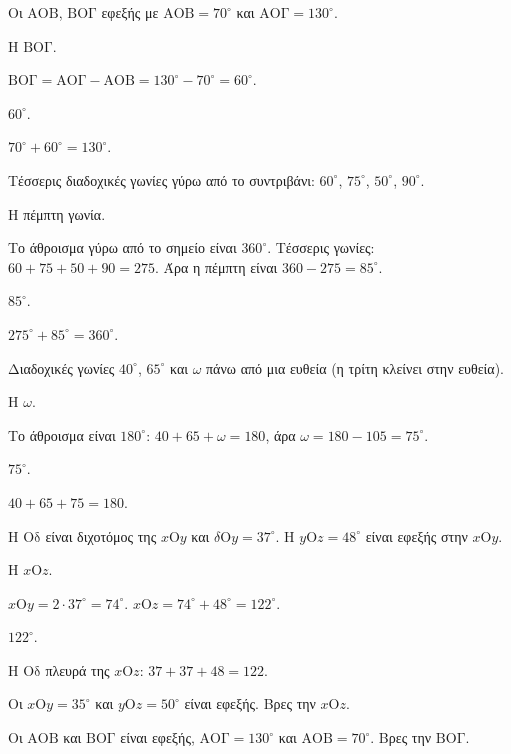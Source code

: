 \tixero Οι $\mathrm{ΑΟΒ}$, $\mathrm{ΒΟΓ}$ εφεξής με $\mathrm{ΑΟΒ}=70^\circ$ και $\mathrm{ΑΟΓ}=130^\circ$.\par
\tithelo Η $\mathrm{ΒΟΓ}$.\par
\possindeo $\mathrm{ΒΟΓ}=\mathrm{ΑΟΓ}-\mathrm{ΑΟΒ}=130^\circ-70^\circ=60^\circ$.\par
\apantisi $60^\circ$.\par
\elegxos $70^\circ+60^\circ=130^\circ$.

\tixero Τέσσερις διαδοχικές γωνίες γύρω από το συντριβάνι: $60^\circ$, $75^\circ$, $50^\circ$, $90^\circ$.\par
\tithelo Η πέμπτη γωνία.\par
\possindeo Το άθροισμα γύρω από το σημείο είναι $360^\circ$. Τέσσερις γωνίες: $60+75+50+90=275$. Άρα η πέμπτη είναι $360-275=85^\circ$.\par
\apantisi $85^\circ$.\par
\elegxos $275^\circ+85^\circ=360^\circ$.

\tixero Διαδοχικές γωνίες $40^\circ$, $65^\circ$ και $\omega$ πάνω από μια ευθεία (η τρίτη κλείνει στην ευθεία).\par
\tithelo Η $\omega$.\par
\possindeo Το άθροισμα είναι $180^\circ$: $40+65+\omega=180$, άρα $\omega=180-105=75^\circ$.\par
\apantisi $75^\circ$.\par
\elegxos $40+65+75=180$.

\tixero Η $\mathrm{Οδ}$ είναι διχοτόμος της $x\mathrm{Ο}y$ και $\delta\mathrm{Ο}y=37^\circ$. Η $y\mathrm{Ο}z=48^\circ$ είναι εφεξής στην $x\mathrm{Ο}y$.\par
\tithelo Η $x\mathrm{Ο}z$.\par
\possindeo $x\mathrm{Ο}y=2\cdot37^\circ=74^\circ$. $x\mathrm{Ο}z=74^\circ+48^\circ=122^\circ$.\par
\apantisi $122^\circ$.\par
\elegxos Η $\mathrm{Οδ}$ πλευρά της $x\mathrm{Ο}z$: $37+37+48=122$.



\ex Οι $x\mathrm{Ο}y=35^\circ$ και $y\mathrm{Ο}z=50^\circ$ είναι εφεξής. Βρες την $x\mathrm{Ο}z$.

\ex Οι $\mathrm{ΑΟΒ}$ και $\mathrm{ΒΟΓ}$ είναι εφεξής, $\mathrm{ΑΟΓ}=130^\circ$ και $\mathrm{ΑΟΒ}=70^\circ$. Βρες την $\mathrm{ΒΟΓ}$.


